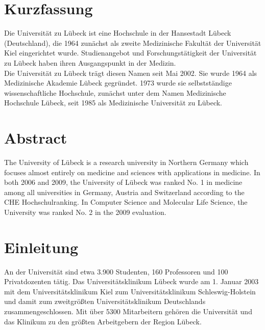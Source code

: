 \documentclass[a4paper]{article}
\begin{document}
\newpage 
\thispagestyle{empty}
\quad 
\newpage
{}
\setcounter{page}{5}
\section*{Kurzfassung}
Die Universität zu Lübeck ist eine Hochschule in der Hansestadt Lübeck (Deutschland), die 1964 zunächst als zweite Medizinische Fakultät der Universität Kiel eingerichtet wurde. Studienangebot und Forschungstätigkeit der Universität zu Lübeck haben ihren Ausgangspunkt in der Medizin.\\
\noindent Die Universität zu Lübeck trägt diesen Namen seit Mai 2002. Sie wurde 1964 als Medizinische Akademie Lübeck gegründet. 1973 wurde sie selbstständige wissenschaftliche Hochschule, zunächst unter dem Namen Medizinische Hochschule Lübeck, seit 1985 als Medizinische Universität zu Lübeck.

\newpage 
\thispagestyle{empty}
\quad 
\newpage
{}
\setcounter{page}{7}
\section*{Abstract}
The University of Lübeck is a research university in Northern Germany which focuses almost entirely on medicine and sciences with applications in medicine. In both 2006 and 2009, the University of Lübeck was ranked No. 1 in medicine among all universities in Germany, Austria and Switzerland according to the CHE Hochschulranking. In Computer Science and Molecular Life Science, the University was ranked No. 2 in the 2009 evaluation.

\newpage 
\thispagestyle{empty}
\quad 
\newpage
{}
\setcounter{page}{9}

\tableofcontents
\newpage

\newpage
\thispagestyle{empty}
\quad 
\newpage
{}     
\setcounter{page}{1}
\section{Einleitung}
An der Universität sind etwa 3.900 Studenten, 160 Professoren und 100 Privatdozenten tätig. Das Universitätsklinikum Lübeck wurde am 1. Januar 2003 mit dem Universitätsklinikum Kiel zum Universitätsklinikum Schleswig-Holstein und damit zum zweitgrößten Universitätsklinikum Deutschlands zusammengeschlossen. Mit über 5300 Mitarbeitern gehören die Universität und das Klinikum zu den größten Arbeitgebern der Region Lübeck.\\
\end{document}
